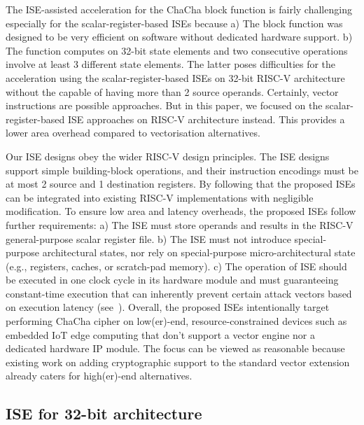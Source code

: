 
The ISE-assisted acceleration for the ChaCha block function is fairly challenging especially for the scalar-register-based ISEs because 
a) The block function was designed to be very efficient on software without dedicated hardware support. 
b) The function computes on 32-bit state elements and two consecutive operations involve at least 3 different state elements. 
The latter poses difficulties for the acceleration using the scalar-register-based ISEs on 32-bit RISC-V architecture without the capable of having more than 2 source operands.
Certainly, vector instructions are possible approaches. 
But in this paper, we focused on the scalar-register-based ISE approaches on RISC-V architecture instead. 
This provides a lower area overhead compared to vectorisation alternatives. 

Our ISE designs obey the wider RISC-V design principles. 
The ISE designs support simple building-block operations, and their instruction encodings must be at most 2 source and 1 destination registers. 
By following that the proposed ISEs can be integrated into existing RISC-V implementations with negligible modification.
To ensure low area and latency overheads, the proposed ISEs follow further requirements: 
a) The ISE must store operands and results in the RISC-V general-purpose scalar register file. 
b) The ISE must not introduce special-purpose architectural states, nor rely on special-purpose micro-architectural state (e.g., registers, caches, or scratch-pad memory).
c) The operation of ISE should be executed in one clock cycle in its hardware module and 
must guaranteeing constant-time execution 
that can inherently prevent certain attack vectors based on execution latency (see~\cite[Section 4]{GYC:18}).
Overall, the proposed ISEs intentionally target performing ChaCha cipher on low(er)-end, resource-constrained devices such as embedded IoT edge computing that don't support a vector engine nor a dedicated hardware IP module. The focus can be viewed as reasonable because existing work on adding cryptographic support to the standard vector extension \cite{riscv:ext:vector:draft} already caters for high(er)-end alternatives. 

\subsection{ISE for 32-bit architecture}

